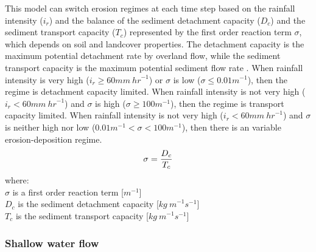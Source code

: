 \documentclass[gmd, manuscript]{copernicus}
\begin{document}
This model can switch erosion regimes at each time step
based on the rainfall intensity ($i_r$)
and the balance of the sediment detachment capacity ($D_c$)
and the sediment transport capacity ($T_c$)
represented by the first order reaction term $\sigma$, 
which depends on soil and landcover properties.
The detachment capacity is the maximum potential 
detachment rate by overland flow, while
the sediment transport capacity 
is the maximum potential sediment flow rate 
\citep{Mitasova2001}.
When rainfall intensity is very high ($i_r \geq 60 \unit{mm~hr}^{-1}$)
or $\sigma$ is low ($\sigma \leq 0.01 \unit{m}^{-1}$),
then the regime is detachment capacity limited. 
%
When rainfall intensity is not very high ($i_r < 60 \unit{mm~hr}^{-1} $)
and $\sigma$ is high ($\sigma \geq 100 \unit{m}^{-1}$),
then the regime is transport capacity limited. 
%
When rainfall intensity is not very high 
($i_r<60 \unit{mm~hr}^{-1}$)
and $\sigma$ is neither high nor low 
($ 0.01 \unit{m}^{-1}< \sigma < 100 \unit{m}^{-1}$),
then there is an variable erosion-deposition regime. \\
\begin{equation}
\label{eq:regime}
\sigma = {D_c \over T_c}
\end{equation}
{\small
\noindent
where: \\
\noindent
\hspace*{0.5em} $\sigma$  is a first order reaction term [$\unit{m}^{-1}$]\\
\hspace*{0.5em} $D_c$ is the sediment detachment capacity [$\unit{kg~m}^{-1}s^{-1}$]\\
\hspace*{0.5em} $T_c$ is the sediment transport capacity [$\unit{kg~m}^{-1}s^{-1}$]\\
}


\subsubsection{Shallow water flow}
\end{document}
